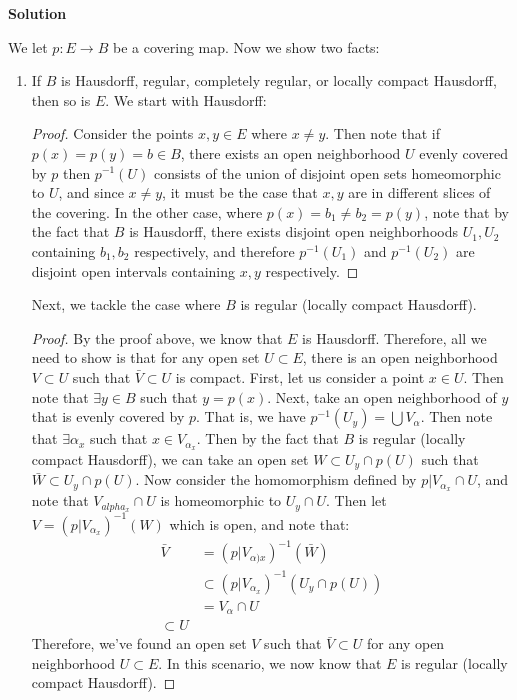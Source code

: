 \documentclass[12pt]{article}
\newcounter{AnswerCounter}
\newcounter{SubAnswerCounter}
\newenvironment{answer}[0]{
  \setcounter{SubAnswerCounter}{1}
  \bigskip
  \textbf{Solution \arabic{AnswerCounter}}
  \\
  \begin{small}
}{
  \end{small}
  \stepcounter{AnswerCounter}
}
\begin{document}
\begin{answer}[Page 341, \#6]
We let $p: E \to B$ be a covering map. Now we show two facts:
\begin{enumerate}
\item If $B$ is Hausdorff, regular, completely regular, or locally compact Hausdorff, then so is $E$. We start with Hausdorff:
\begin{proof}
Consider the points $x,y \in E$ where $x \neq y$. Then note that if $p(x) = p(y) = b \in B$, there exists an open neighborhood $U$ evenly covered by $p$ then $p^{-1}(U)$ consists of the union of disjoint open sets homeomorphic to $U$, and since $x \neq y$, it must be the case that $x,y$ are in different slices of the covering. In the other case, where $p(x) = b_1 \neq b_2 = p(y)$, note that by the fact that $B$ is Hausdorff, there exists disjoint open neighborhoods $U_1, U_2$ containing $b_1, b_2$ respectively, and therefore $p^{-1}(U_1)$ and $p^{-1}(U_2)$ are disjoint open intervals containing $x,y$ respectively.
\end{proof}
Next, we tackle the case where $B$ is regular (locally compact Hausdorff).
\begin{proof}
By the proof above, we know that $E$ is Hausdorff. Therefore, all we need to show is that for any open set $U \subset E$, there is an open neighborhood $V \subset U$ such that $\bar{V} \subset U$ is compact. First, let us consider a point $x \in U$. Then note that $ \exists y \in B$ such that $y= p(x)$. Next, take an open neighborhood of $y$ that is evenly covered by $p$. That is, we have $p^{-1}(U_y) = \bigcup V_{\alpha}$. Then note that $\exists \alpha_x$ such that $x \in V_{\alpha_x}$. Then by the fact that $B$ is regular (locally compact Hausdorff), we can take an open set $W \subset U_y \cap p(U)$ such that $\bar{W} \subset U_y \cap p(U)$. Now consider the homomorphism defined by $p | V_{\alpha_x} \cap U$, and note that $V_{alpha_x} \cap U$ is homeomorphic to $U_y \cap U$. Then let $V = (p | V_{\alpha_x})^{-1}(W)$ which is open, and note that:
\begin{align*}
\bar{V} &= (p | V_{\alpha)x})^{-1}(\bar{W}) \\
&\subset (p | V_{\alpha_x})^{-1}(U_y \cap p(U)) \\
&= V_{\alpha} \cap U \\
\subset U
\end{align*}
Therefore, we've found an open set $V$ such that $\bar{V} \subset U$ for any open neighborhood $U \subset E$. In this scenario, we now know that $E$ is regular (locally compact Hausdorff).

\end{proof}
\end{enumerate}
\end{answer}
\end{document}
